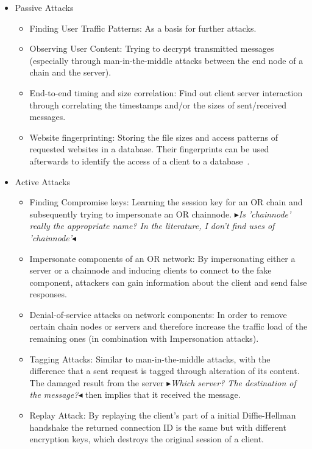 \documentclass{sig-alternate}
\newcommand{\boxedtext}[1]{\fbox{\scriptsize\bfseries\textsf{#1}}}
\newcommand{\nota}[2]{
   \boxedtext{#1}
       {\small$\blacktriangleright$\emph{\textsl{#2}}$\blacktriangleleft$}
}
\newcommand\fk[1]{\nota{FK}{#1}}
\begin{document}
\begin{description} 
	\begin{itemize} \itemsep0pt 
		\item Passive Attacks
		\begin{itemize} \itemsep0pt 
			\item Finding User Traffic Patterns: As a basis for further attacks.
			\item Observing User Content: Trying to decrypt transmitted messages (especially through man-in-the-middle attacks between the end node of a chain and the server).
			\item End-to-end timing and size correlation: Find out client server interaction through correlating the timestamps and/or the sizes of sent/received messages.
			\item Website fingerprinting: Storing the file sizes and access patterns of requested websites in a database. Their fingerprints can be used afterwards to identify the access of a client to a database~\cite{panchenko2011website}.
		\end{itemize}
		\item Active Attacks
		\begin{itemize} \itemsep0pt 
			\item Finding Compromise keys: Learning the session key for an OR chain and subsequently trying to impersonate an OR chainnode. \fk{Is 'chainnode' really the appropriate name? In the literature, I don't find uses of 'chainnode'}
			\item Impersonate components of an OR network: By impersonating either a server or a chainnode and inducing clients to connect to the fake component, attackers can gain information about the client and send false responses.
			\item Denial-of-service attacks on network components: In order to remove certain chain nodes or servers and therefore increase the traffic load of the remaining ones (in combination with Impersonation attacks).
			\item Tagging Attacks: Similar to man-in-the-middle attacks, with the difference that a sent request is tagged through alteration of its content. The damaged result from the server \fk{Which server? The destination of the message?} then implies that it received the message. 
			\item Replay Attack: By replaying the client's part of a initial Diffie-Hellman handshake the returned connection ID is the same but with different encryption keys, which destroys the original session of a client.

\end{itemize}
\end{itemize}
\end{description}
\end{document}
